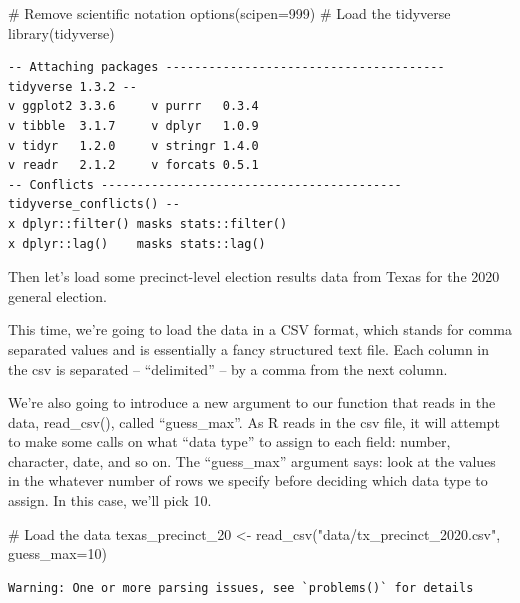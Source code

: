 \documentclass[
  letterpaper,
  DIV=11,
  numbers=noendperiod]{scrreprt}
\newenvironment{Shaded}{\begin{snugshade}}{\end{snugshade}}
\newcommand{\AttributeTok}[1]{\textcolor[rgb]{0.40,0.45,0.13}{#1}}
\newcommand{\CommentTok}[1]{\textcolor[rgb]{0.37,0.37,0.37}{#1}}
\newcommand{\DecValTok}[1]{\textcolor[rgb]{0.68,0.00,0.00}{#1}}
\newcommand{\FunctionTok}[1]{\textcolor[rgb]{0.28,0.35,0.67}{#1}}
\newcommand{\NormalTok}[1]{\textcolor[rgb]{0.00,0.23,0.31}{#1}}
\newcommand{\OtherTok}[1]{\textcolor[rgb]{0.00,0.23,0.31}{#1}}
\newcommand{\StringTok}[1]{\textcolor[rgb]{0.13,0.47,0.30}{#1}}
\begin{document}
\begin{Shaded}
\begin{Highlighting}[]
\CommentTok{\# Remove scientific notation}
\FunctionTok{options}\NormalTok{(}\AttributeTok{scipen=}\DecValTok{999}\NormalTok{)}
\CommentTok{\# Load the tidyverse}
\FunctionTok{library}\NormalTok{(tidyverse)}
\end{Highlighting}
\end{Shaded}

\begin{verbatim}
-- Attaching packages --------------------------------------- tidyverse 1.3.2 --
v ggplot2 3.3.6     v purrr   0.3.4
v tibble  3.1.7     v dplyr   1.0.9
v tidyr   1.2.0     v stringr 1.4.0
v readr   2.1.2     v forcats 0.5.1
-- Conflicts ------------------------------------------ tidyverse_conflicts() --
x dplyr::filter() masks stats::filter()
x dplyr::lag()    masks stats::lag()
\end{verbatim}

Then let's load some precinct-level election results data from Texas for
the 2020 general election.

This time, we're going to load the data in a CSV format, which stands
for comma separated values and is essentially a fancy structured text
file. Each column in the csv is separated -- ``delimited'' -- by a comma
from the next column.

We're also going to introduce a new argument to our function that reads
in the data, read\_csv(), called ``guess\_max''. As R reads in the csv
file, it will attempt to make some calls on what ``data type'' to assign
to each field: number, character, date, and so on. The ``guess\_max''
argument says: look at the values in the whatever number of rows we
specify before deciding which data type to assign. In this case, we'll
pick 10.

\begin{Shaded}
\begin{Highlighting}[]
\CommentTok{\# Load the data}
\NormalTok{texas\_precinct\_20 }\OtherTok{\textless{}{-}} \FunctionTok{read\_csv}\NormalTok{(}\StringTok{"data/tx\_precinct\_2020.csv"}\NormalTok{, }\AttributeTok{guess\_max=}\DecValTok{10}\NormalTok{)}
\end{Highlighting}
\end{Shaded}

\begin{verbatim}
Warning: One or more parsing issues, see `problems()` for details
\end{verbatim}
\end{document}
